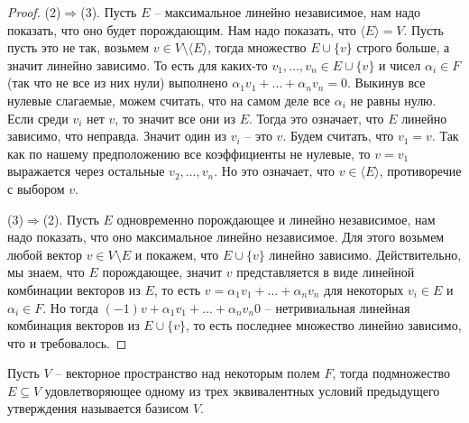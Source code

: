 \begin{proof}
(2)$\Rightarrow$(3). Пусть $E$ -- максимальное линейно независимое, нам надо показать, что оно будет порождающим. Нам надо показать, что $\langle E \rangle  = V$. Пусть пусть это не так, возьмем $v\in V\setminus \langle E \rangle$, тогда множество $E\cup \{v\}$ строго больше, а значит линейно зависимо. То есть для каких-то $v_1,\ldots,v_n \in E\cup \{v\}$ и чисел $\alpha_i \in F$ (так что не все из них нули) выполнено $\alpha_1 v_1 + \ldots + \alpha_n v_n = 0$. Выкинув все нулевые слагаемые, можем считать, что на самом деле все $\alpha_i$ не равны нулю. Если среди $v_i$ нет $v$, то значит все они из $E$. Тогда это означает, что $E$ линейно зависимо, что неправда. Значит один из $v_i$ -- это $v$. Будем считать, что $v_1 = v$. Так как по нашему предположению все коэффициенты не нулевые, то $v = v_1$ выражается через остальные $v_2,\ldots,v_n$. Но это означает, что $v\in \langle E\rangle$, противоречие с выбором $v$.

(3)$\Rightarrow$(2). Пусть $E$ одновременно порождающее и линейно независимое, нам надо показать, что оно максимальное линейно независимое. Для этого возьмем любой вектор $v\in V\setminus E$ и покажем, что $E \cup \{v\}$ линейно зависимо. Действительно, мы знаем, что $E$ порождающее, значит $v$ представляется в виде линейной комбинации векторов из $E$, то есть $v = \alpha_1 v_1 + \ldots + \alpha_n v_n$ для некоторых $v_i\in E$ и $\alpha_i\in F$. Но тогда $(-1)v + \alpha_1 v_1 + \ldots + \alpha_n v_n  0$ -- нетривиальная линейная комбинация векторов из $E\cup \{v\}$, то есть последнее множество линейно зависимо, что и требовалось.
\end{proof}

Пусть $V$ -- векторное пространство над некоторым полем $F$, тогда подмножество $E\subseteq V$ удовлетворяющее одному из трех эквивалентных условий предыдущего утверждения называется базисом $V$.

